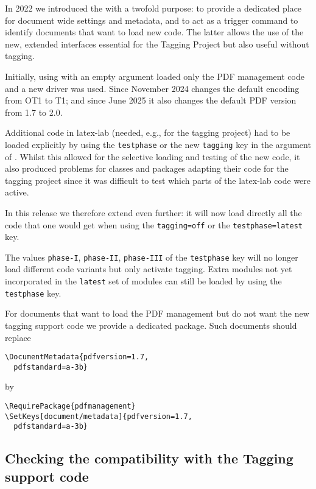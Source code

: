 \documentclass{ltnews}
\begin{document}
In 2022 we introduced the  with a twofold
purpose: to provide a dedicated place for document wide settings and
metadata, and to act as a trigger command to identify documents that
want to load new code.  The latter allows the use of the new, extended
interfaces essential for the Tagging Project but also useful
without tagging.

Initially, using  with an empty argument loaded
only the PDF management code and a new  driver was used.
Since November 2024  changes the default encoding
from OT1 to T1; and since June 2025 it also changes the default PDF
version from 1.7 to 2.0.

Additional code in latex-lab (needed, e.g., for the tagging project)
had to be loaded explicitly by using the \texttt{testphase} or the new
\texttt{tagging} key in the argument of . Whilst
this allowed for the selective loading and testing of the new code, it
also produced problems for classes and packages adapting their code
for the tagging project since it was difficult to test which parts of
the latex-lab code were active.

In this release we therefore extend  even
further: it will now load directly all the code that one would get when
using the \texttt{tagging=off} or the \texttt{testphase=latest} key.

The values \texttt{phase-I}, \texttt{phase-II}, \texttt{phase-III} of
the \texttt{testphase} key will no longer load different code variants
but only activate tagging. Extra modules not yet incorporated in the
\texttt{latest} set of modules can still be loaded by using the
\texttt{testphase} key.

For documents that want to load the PDF management but do not want the
new tagging support code we provide a dedicated package. Such
documents should replace
\begin{verbatim}
\DocumentMetadata{pdfversion=1.7,
  pdfstandard=a-3b}
\end{verbatim}
by
\begin{verbatim}
\RequirePackage{pdfmanagement}
\SetKeys[document/metadata]{pdfversion=1.7,
  pdfstandard=a-3b}
\end{verbatim}

\subsection{Checking the compatibility with the Tagging support code}
\end{document}
